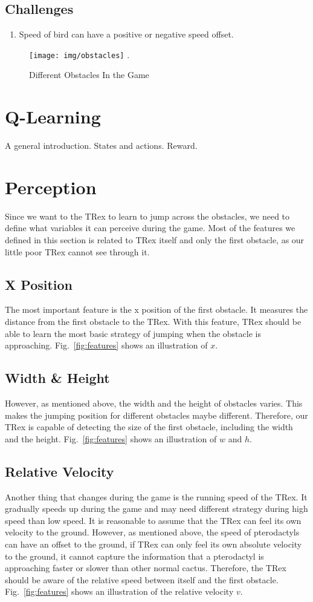 \documentclass[conference]{IEEEtran}
\begin{document}
\subsection{Challenges}
\begin{enumerate}
    \item Speed of bird can have a positive or negative speed offset.
\end{enumerate}
\begin{figure}[ht]
\centering
\texttt{[image: img/obstacles]}
\DeclareGraphicsExtensions.
\caption{Different Obstacles In the Game}
\label{fig:obstacles}
\end{figure}


\section{Q-Learning}
A general introduction. States and actions. Reward.

\section{Perception}
Since we want to the TRex to learn to jump across the obstacles, we need to define what variables it can perceive during the game. Most of the features we defined in this section is related to TRex itself and only the first obstacle, as our little poor TRex cannot see through it.
\subsection{X Position}
The most important feature is the x position of the first obstacle. It measures the distance from the first obstacle to the TRex. With this feature, TRex should be able to learn the most basic strategy of jumping when the obstacle is approaching. Fig.~\ref{fig:features} shows an illustration of $x$.
\subsection{Width \& Height}
However, as mentioned above, the width and the height of obstacles varies. This makes the jumping position for different obstacles maybe different. Therefore, our TRex is capable of detecting the size of the first obstacle, including the width and the height. Fig.~\ref{fig:features} shows an illustration of $w$ and $h$.
\subsection{Relative Velocity}
Another thing that changes during the game is the running speed of the TRex. It gradually speeds up during the game and may need different strategy during high speed than low speed. It is reasonable to assume that the TRex can feel its own velocity to the ground. However, as mentioned above, the speed of pterodactyls can have an offset to the ground, if TRex can only feel its own absolute velocity to the ground, it cannot capture the information that a pterodactyl is approaching faster or slower than other normal cactus. Therefore, the TRex should be aware of the relative speed between itself and the first obstacle. Fig.~\ref{fig:features} shows an illustration of the relative velocity $v$.
\end{document}
